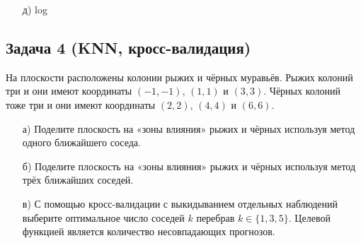 \documentclass[12pt, a4paper, oneside]{article}
\begin{document}
{\begin{enumerate}
		\[TPR = \frac{TP}{TP +FN} \qquad FPR = \frac{FP}{FP +TN}, \]
		
		перебирать порог и в осях, соответсвующих $TPR$ и $FPR$ отмечать точки. В итоге получится ровно такая же кривая как у нас. Именно такое определение вы встретите в большинстве курсов по ML. Но любой нормальный человек сразу же забывает что означают эти $FPRFRTPRPR$, поэтому мы так делать не будем. 
		
		Единственный профит от такого определения в том, что сразу же видно, что roc-auc устройчив к дисбалансу в классах. 
		
		\item[д)]  log 
		
	\end{enumerate}
}



\subsection*{Задача 4 (KNN, кросс-валидация)}

На плоскости расположены колонии рыжих и чёрных муравьёв. Рыжих колоний три и они имеют координаты $(-1, -1)$, $(1, 1)$ и $(3, 3)$. Чёрных колоний тоже три и они имеют координаты $(2, 2)$, $(4, 4)$ и $(6, 6)$.

\begin{enumerate}
	\item[а)] Поделите плоскость на «зоны влияния» рыжих и чёрных используя метод одного ближайшего соседа.
	\item[б)] Поделите плоскость на «зоны влияния» рыжих и чёрных используя метод трёх ближайших соседей.
	\item[в)] С помощью кросс-валидации с выкидыванием отдельных наблюдений выберите оптимальное число соседей $k$ перебрав $k \in \{1, 3, 5\}$. Целевой функцией является количество несовпадающих прогнозов.
\end{enumerate}
\end{document}

